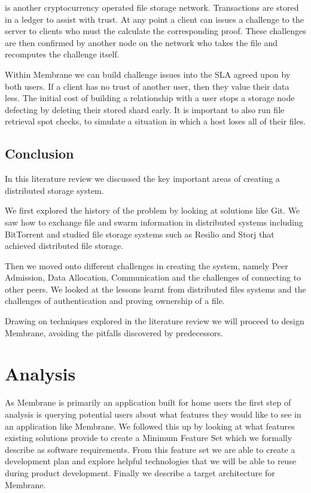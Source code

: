 \documentclass[a4paper, 11pt, twocolumn, twoside]{report}
\begin{document}
\cite{filecoin2014filecoin} is another cryptocurrency operated file storage network. Transactions are stored in a ledger to assist with trust. At any point a client can issues a challenge to the server to clients who must the calculate the corresponding proof. These challenges are then confirmed by another node on the network who takes the file and recomputes the challenge itself.

Within Membrane we can build challenge issues into the SLA agreed upon by both users. If a client has no trust of another user, then they value their data less. The initial cost of building a relationship with a user stops a storage node defecting by deleting their stored shard early. It is important to also run file retrieval spot checks, to simulate a situation in which a host loses all of their files.

\section{Conclusion}
In this literature review we discussed the key important areas of creating a distributed storage system.

We first explored the history of the problem by looking at solutions like Git. We saw how to exchange file and swarm information in distributed systems including BitTorrent and studied file storage systems such as Resilio and Storj that achieved distributed file storage.

Then we moved onto different challenges in creating the system, namely Peer Admission, Data Allocation, Communication and the challenges of connecting to other peers. We looked at the lessons learnt from distributed files systems and the challenges of authentication and proving ownership of a file.

Drawing on techniques explored in the literature review we will proceed to design Membrane, avoiding the pitfalls discovered by predecessors.

\chapter{Analysis}

As Membrane is primarily an application built for home users the first step of analysis is querying potential users about what features they would like to see in an application like Membrane. We followed this up by looking at what features existing solutions provide to create a Minimum Feature Set which we formally describe as software requirements. From this feature set we are able to create a development plan and explore helpful technologies that we will be able to reuse during product development. Finally we describe a target architecture for Membrane.
\end{document}
